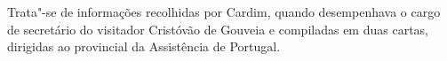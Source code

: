 Trata"-se de informações recolhidas por Cardim, quando desempenhava o
cargo de secretário do visitador Cristóvão de Gouveia e compiladas em
duas cartas, dirigidas ao provincial da Assistência de Portugal. 
%
%
